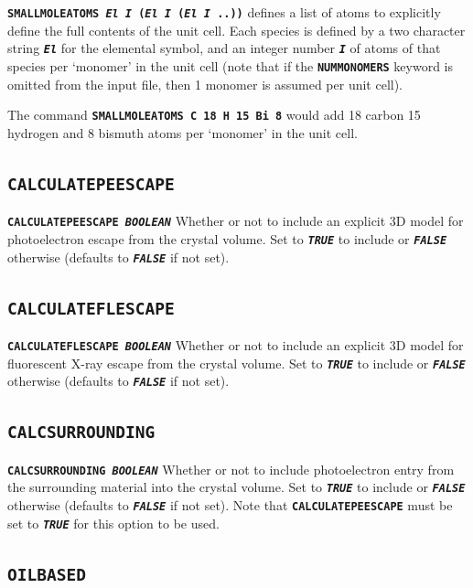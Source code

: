 \documentclass[a4paper]{article}
\newcommand{\Keyword}[1]{\texttt{\textbf{#1}}\xspace}
\begin{document}
\noindent \Keyword{SMALLMOLEATOMS \textit{El I} (\textit{El I} (\textit{El I} ..))}
defines a list of atoms to explicitly define the full contents of the unit cell. Each species is defined by a two character string \Keyword{\textit{El}} for the elemental symbol, and an integer number \Keyword{\textit{I}} of atoms of that species per `monomer' in the unit cell (note that if the  \Keyword{NUMMONOMERS} keyword is omitted from the input file, then 1 monomer is assumed per unit cell).

The command \Keyword{SMALLMOLEATOMS C 18 H 15 Bi 8} would add 18 carbon 15 hydrogen and 8 bismuth atoms per `monomer' in the unit cell.

\subsection{\Keyword{CALCULATEPEESCAPE}}
\label{calculatepeescape}

\noindent \Keyword{CALCULATEPEESCAPE \textit{BOOLEAN}}
Whether or not to include an explicit 3D model for photoelectron escape from the crystal volume. Set to \Keyword{\textit{TRUE}} to include or \Keyword{\textit{FALSE}} otherwise (defaults to \Keyword{\textit{FALSE}} if not set). 

\subsection{\Keyword{CALCULATEFLESCAPE}}
\label{calculateflescape}

\noindent \Keyword{CALCULATEFLESCAPE \textit{BOOLEAN}}
Whether or not to include an explicit 3D model for fluorescent X-ray escape from the crystal volume. Set to \Keyword{\textit{TRUE}} to include or \Keyword{\textit{FALSE}} otherwise (defaults to \Keyword{\textit{FALSE}} if not set).

\subsection{\Keyword{CALCSURROUNDING}}
\label{calcsurrounding}

\noindent \Keyword{CALCSURROUNDING \textit{BOOLEAN}}
Whether or not to include photoelectron entry from the surrounding material into the crystal volume. Set to \Keyword{\textit{TRUE}} to include or \Keyword{\textit{FALSE}} otherwise (defaults to \Keyword{\textit{FALSE}} if not set).
Note that \Keyword{CALCULATEPEESCAPE} must be set to \Keyword{\textit{TRUE}} for this option to be used.

\subsection{\Keyword{OILBASED}}
\label{oilbased}
\end{document}

